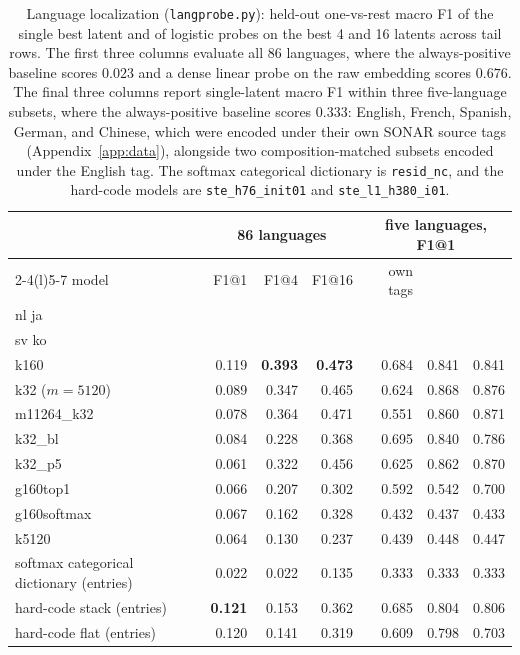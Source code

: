 \begin{table}[htbp]\centering\small\setlength{\tabcolsep}{4pt}
\begin{tabular}{@{}lrrrrrr@{}}
\toprule
& \multicolumn{3}{c}{86 languages} & \multicolumn{3}{c}{five languages, F1@1} \\
\cmidrule(lr){2-4}\cmidrule(l){5-7}
model & F1@1 & F1@4 & F1@16 & own tags & \stackhead[r]{it pt\\nl ja} & \stackhead[r]{ca ro\\sv ko} \\
\midrule
k160             & 0.119 & \textbf{0.393} & \textbf{0.473} & 0.684 & 0.841 & 0.841 \\
k32 ($m{=}5120$) & 0.089 & 0.347 & 0.465 & 0.624 & 0.868 & 0.876 \\
m11264\_k32      & 0.078 & 0.364 & 0.471 & 0.551 & 0.860 & 0.871 \\
k32\_bl          & 0.084 & 0.228 & 0.368 & 0.695 & 0.840 & 0.786 \\
k32\_p5          & 0.061 & 0.322 & 0.456 & 0.625 & 0.862 & 0.870 \\
g160top1         & 0.066 & 0.207 & 0.302 & 0.592 & 0.542 & 0.700 \\
g160softmax      & 0.067 & 0.162 & 0.328 & 0.432 & 0.437 & 0.433 \\
k5120            & 0.064 & 0.130 & 0.237 & 0.439 & 0.448 & 0.447 \\
softmax categorical dictionary (entries) & 0.022 & 0.022 & 0.135 & 0.333 & 0.333 & 0.333 \\
hard-code stack (entries) & \textbf{0.121} & 0.153 & 0.362 & 0.685 & 0.804 & 0.806 \\
hard-code flat (entries) & 0.120 & 0.141 & 0.319 & 0.609 & 0.798 & 0.703 \\
\bottomrule
\end{tabular}
\caption{Language localization (\texttt{langprobe.py}): held-out
one-vs-rest macro F1 of the single best latent and of logistic probes on
the best 4 and 16 latents across tail rows. The first three columns
evaluate all 86 languages, where the always-positive baseline scores
$0.023$ and a dense linear probe on the raw embedding scores $0.676$. The
final three columns report single-latent macro F1 within three
five-language subsets, where the always-positive baseline scores $0.333$:
English, French, Spanish, German, and Chinese, which were encoded under
their own SONAR source tags (Appendix~\ref{app:data}), alongside two
composition-matched subsets encoded under the English tag. The softmax
categorical dictionary is \texttt{resid\_nc}, and the hard-code models are
\texttt{ste\_h76\_init01} and \texttt{ste\_l1\_h380\_i01}.}
\label{tab:langlocal}
\end{table}

